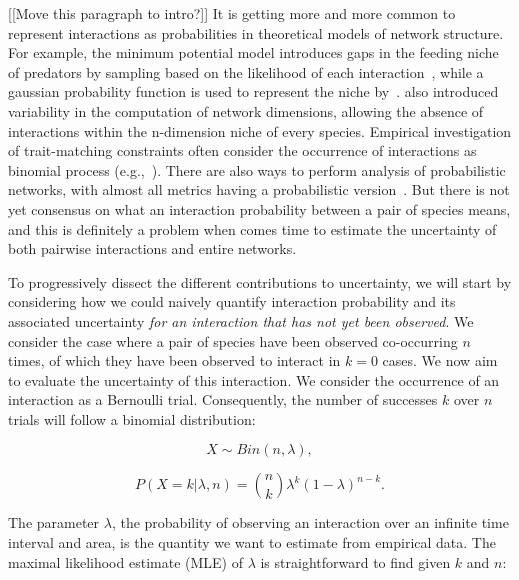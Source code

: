 \documentclass[12pt]{article}
\begin{document}
\begin{spacing}{2.0}


   [[Move this paragraph to intro?]] It is getting more and more common to represent interactions as probabilities in theoretical models of network structure. For example, the minimum potential model introduces gaps in the feeding niche of predators by sampling based on the likelihood of each interaction~\citep{Allesina2008}, while a gaussian probability function is used to represent the niche by~\citet{Williams2010}. \citet{Eklof2013} also introduced variability  in the computation of network dimensions, allowing the absence of interactions within the n-dimension niche of every species. Empirical investigation of trait-matching constraints often consider the occurrence of interactions as binomial process (e.g.,~\citealp{Rohr2016}). There are also ways to perform analysis of probabilistic networks, with almost all metrics having a probabilistic version~\citep{Poisot2016}. But there is not yet consensus on what an interaction probability between a pair of species means, and this is definitely a problem when comes time to estimate the uncertainty of both pairwise interactions and entire networks. 


  To progressively dissect the different contributions to uncertainty, we will start by considering how we could naively quantify interaction probability and its associated uncertainty \emph{for an interaction that has not yet been observed}. We consider the case where a pair of species have been observed co-occurring $n$ times, of which they have been observed to interact in $k = 0$ cases. We now aim to evaluate the uncertainty of this interaction. We consider the occurrence of an interaction as a Bernoulli trial. Consequently, the number of successes $k$ over $n$ trials will follow a binomial distribution: 
      
      \begin{equation}
        X \sim Bin(n,\lambda) ,
      \end{equation}


      \begin{equation}
         P(X = k|\lambda,n) = {n \choose k}\lambda^k(1-\lambda)^{n-k} . 
         \label{likelihood}
      \end{equation}

  \noindent The parameter $\lambda$, the probability of observing an interaction over an infinite time interval and area, is the quantity we want to estimate from empirical data. 
  The maximal likelihood estimate (MLE) of $\lambda$ is straightforward to find given $k$ and $n$:


\end{spacing}
\end{document}
